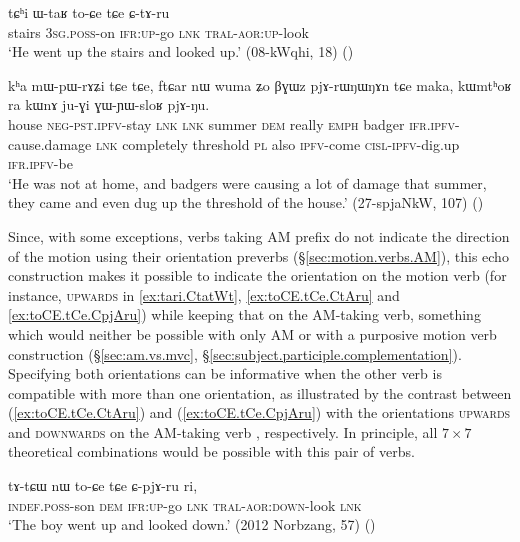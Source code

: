 \begin{exe}
\ex \label{ex:toCE.tCe.CtAru}
\gll tɕʰi ɯ-taʁ to-ɕe tɕe ɕ-tɤ-ru   \\
stairs \textsc{3sg}.\textsc{poss}-on \textsc{ifr}:\textsc{up}-go \textsc{lnk}  \textsc{tral}-\textsc{aor}:\textsc{up}-look \\
\glt `He went up the stairs and looked up.'  (08-kWqhi, 18)
()
\end{exe}

\begin{exe}
\ex \label{ex:GWYWsloR}
\gll kʰa mɯ-pɯ-rɤʑi tɕe tɕe, ftɕar nɯ wuma ʑo βɣɯz pjɤ-rɯŋɯŋɤn tɕe maka, kɯmtʰoʁ ra kɯnɤ ju-ɣi ɣɯ-ɲɯ-sloʁ pjɤ-ŋu. \\
house \textsc{neg}-\textsc{pst}.\textsc{ipfv}-stay \textsc{lnk} \textsc{lnk} summer \textsc{dem} really \textsc{emph} badger \textsc{ifr}.\textsc{ipfv}-cause.damage \textsc{lnk} completely threshold \textsc{pl} also \textsc{ipfv}-come \textsc{cisl}-\textsc{ipfv}-dig.up \textsc{ifr}.\textsc{ipfv}-be \\
\glt `He was not at home, and badgers were causing a lot of damage that summer, they came and even dug up the threshold of the house.'  (27-spjaNkW, 107)
()
\end{exe}

Since, with some exceptions, verbs taking AM prefix do not indicate the direction of the motion using their orientation preverbs (§\ref{sec:motion.verbs.AM}), this echo construction makes it possible to indicate the orientation on the motion verb (for instance, \textsc{upwards} in \ref{ex:tari.CtatWt}, \ref{ex:toCE.tCe.CtAru} and \ref{ex:toCE.tCe.CpjAru}) while keeping that on the AM-taking verb, something which would neither be possible with only AM or with a purposive motion verb construction (§\ref{sec:am.vs.mvc}, §\ref{sec:subject.participle.complementation}). Specifying both orientations can be informative when the other verb is compatible with more than one orientation, as illustrated by the contrast between (\ref{ex:toCE.tCe.CtAru}) and (\ref{ex:toCE.tCe.CpjAru}) with the orientations \textsc{upwards} and \textsc{downwards} on the AM-taking verb , respectively. In principle, all $7\times7$ theoretical combinations would be possible with this pair of verbs.

\begin{exe}
\ex \label{ex:toCE.tCe.CpjAru}
\gll tɤ-tɕɯ nɯ to-ɕe tɕe ɕ-pjɤ-ru ri, \\
\textsc{indef}.\textsc{poss}-son \textsc{dem} \textsc{ifr}:\textsc{up}-go \textsc{lnk}  \textsc{tral}-\textsc{aor}:\textsc{down}-look \textsc{lnk} \\
\glt `The boy went up and looked down.' (2012 Norbzang, 57)
()
\end{exe}

